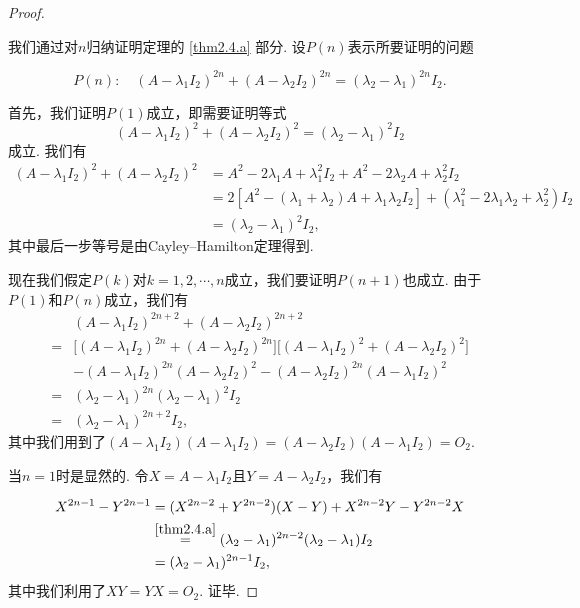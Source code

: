\begin{proof}
  \begin{enuma}
    \item 我们通过对$n$归纳证明定理的 \ref{thm2.4.a} 部分. 设$P(n)$表示所要证明的问题
  \end{enuma}
    \[
      P(n):\quad (A-\lambda_1I_2)^{2n}+(A-\lambda_2I_2)^{2n}
          =(\lambda_2-\lambda_1)^{2n}I_2.
    \]

    首先，我们证明$P(1)$成立，即需要证明等式
    \[
      (A - \lambda_1I_2)^2 + (A - \lambda_2I_2)^2 = (\lambda_2 - \lambda_1)^2I_2
    \]
    成立. 我们有
    \begin{align*}
      (A - \lambda_1I_2)^2 + (A - \lambda_2I_2)^2  & = A^2 - 2\lambda_1 A +\lambda_1^2I_2 + A^2 - 2\lambda_2A + \lambda_2^2I_2 \\
      & = 2[A^2 - (\lambda_1 + \lambda_2)A + \lambda_1\lambda_2I_2] + (\lambda_1^2 - 2\lambda_1\lambda_2 + \lambda_2^2)I_2 \\
      & = (\lambda_2 - \lambda_1)^2 I_2,
    \end{align*}
    其中最后一步等号是由Cayley--Hamilton定理得到.

    现在我们假定$P(k)$对$k=1,2,\cdots,n$成立，我们要证明$P(n+1)$也成立. 由于$P(1)$和$P(n)$成立，我们有
    \begin{align*}
      & (A-\lambda_1I_2)^{2n+2}+(A-\lambda_2I_2)^{2n+2}\\
      = {} & \big[ (A - \lambda_1I_2)^{2n} + (A - \lambda_2I_2)^{2n} \big]\big[ (A - \lambda_1I_2)^2 + (A - \lambda_2I_2)^2 \big]\\
      & - (A - \lambda_1I_2)^{2n}(A - \lambda_2I_2)^2 - (A - \lambda_2I_2)^{2n}(A - \lambda_1I_2)^2 \\
      = {} & (\lambda_2 - \lambda_1)^{2n}(\lambda_2 -\lambda_1)^2I_2 \\
      = {}& (\lambda_2 - \lambda_1)^{2n+2}I_2,
    \end{align*}
    其中我们用到了$(A-\lambda_1I_2)(A-\lambda_1I_2)
    =(A-\lambda_2I_2)(A-\lambda_1I_2)=O_2$.

    \begin{enuma}
      \setcounter{enumi}{1}
      \item 当$n=1$时是显然的. 令$X=A-\lambda_1I_2$且$Y=A-\lambda_2I_2$，我们有
    \end{enuma}
      \begin{align*}
        X^{2n-1} - Y^{2n-1} & = (X^{2n-2} + Y^{2n-2})(X - Y) + X^{2n-2}Y - Y^{2n-2}X \\
        & \overset{\ref{thm2.4.a}}{=} (\lambda_2 - \lambda_1)^{2n-2} (\lambda_2 - \lambda_1)I_2 \\
        & = (\lambda_2 - \lambda_1)^{2n-1}I_2,
      \end{align*}
    其中我们利用了$XY=YX=O_2$. 证毕.
\end{proof}

